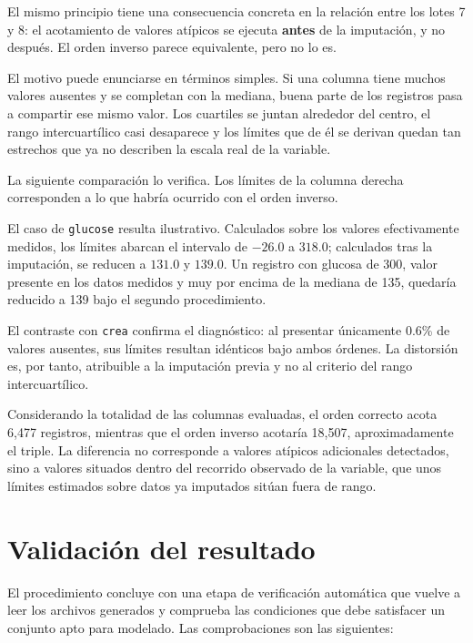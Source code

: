 \documentclass[11pt]{article}
\begin{document}
El mismo principio tiene una consecuencia concreta en la relación entre los lotes 7 y 8: el
acotamiento de valores atípicos se ejecuta \textbf{antes} de la imputación, y no después. El orden
inverso parece equivalente, pero no lo es.

El motivo puede enunciarse en términos simples. Si una columna tiene muchos valores ausentes y se
completan con la mediana, buena parte de los registros pasa a compartir ese mismo valor. Los
cuartiles se juntan alrededor del centro, el rango intercuartílico casi desaparece y los límites
que de él se derivan quedan tan estrechos que ya no describen la escala real de la variable.

La siguiente comparación lo verifica. Los límites de la columna derecha corresponden a lo que
habría ocurrido con el orden inverso.



El caso de \texttt{glucose} resulta ilustrativo. Calculados sobre los valores efectivamente
medidos, los límites abarcan el intervalo de $-26.0$ a $318.0$; calculados tras la imputación, se
reducen a $131.0$ y $139.0$. Un registro con glucosa de 300, valor presente en los datos medidos
y muy por encima de la mediana de 135, quedaría reducido a 139 bajo el segundo procedimiento.

El contraste con \texttt{crea} confirma el diagnóstico: al presentar únicamente 0.6\% de valores
ausentes, sus límites resultan idénticos bajo ambos órdenes. La distorsión es, por tanto,
atribuible a la imputación previa y no al criterio del rango intercuartílico.

Considerando la totalidad de las columnas evaluadas, el orden correcto acota 6{,}477 registros,
mientras que el orden inverso acotaría 18{,}507, aproximadamente el triple. La diferencia no
corresponde a valores atípicos adicionales detectados, sino a valores situados dentro del recorrido
observado de la variable, que unos límites estimados sobre datos ya imputados sitúan fuera de
rango.

\section{Validación del resultado}
\label{sec:validacion}

El procedimiento concluye con una etapa de verificación automática que vuelve a leer los archivos
generados y comprueba las condiciones que debe satisfacer un conjunto apto para modelado. Las
comprobaciones son las siguientes:
\end{document}

